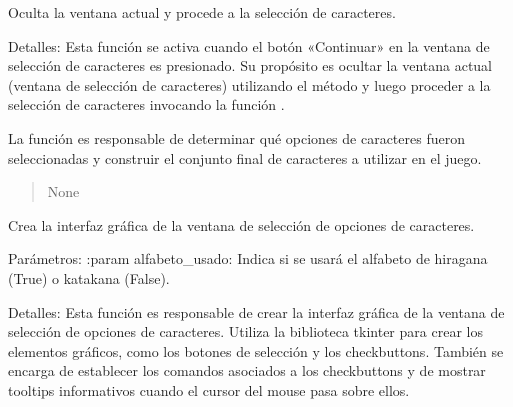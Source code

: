 \documentclass[letterpaper,10pt,spanish]{sphinxmanual}
\begin{document}
\begin{fulllineitems}
\begin{description}
\end{description}

\begin{fulllineitems}
\label{\detokenize{menu_juego:menu_juego.CaracteresSelector.continuar}}
\pysigstartsignatures
{}
\pysigstopsignatures
\sphinxAtStartPar
Oculta la ventana actual y procede a la selección de caracteres.

\sphinxAtStartPar
Detalles:
Esta función se activa cuando el botón «Continuar» en la ventana de selección de caracteres es presionado.
Su propósito es ocultar la ventana actual (ventana de selección de caracteres) utilizando el método 
y luego proceder a la selección de caracteres invocando la función .

\sphinxAtStartPar
La función  es responsable de determinar qué opciones de caracteres fueron
seleccionadas y construir el conjunto final de caracteres a utilizar en el juego.
\begin{quote}\begin{description}
\sphinxAtStartPar
None

\end{description}\end{quote}

\end{fulllineitems}


\begin{fulllineitems}
\label{\detokenize{menu_juego:menu_juego.CaracteresSelector.crear_interfaz}}
\pysigstartsignatures
{}
\pysigstopsignatures
\sphinxAtStartPar
Crea la interfaz gráfica de la ventana de selección de opciones de caracteres.

\sphinxAtStartPar
Parámetros:
:param alfabeto\_usado: Indica si se usará el alfabeto de hiragana (True) o katakana (False).

\sphinxAtStartPar
Detalles:
Esta función es responsable de crear la interfaz gráfica de la ventana de selección de opciones de
caracteres. Utiliza la biblioteca tkinter para crear los elementos gráficos, como los botones de selección y
los checkbuttons. También se encarga de establecer los comandos asociados a los checkbuttons y de mostrar
tooltips informativos cuando el cursor del mouse pasa sobre ellos.


\end{fulllineitems}
\end{fulllineitems}
\end{document}
